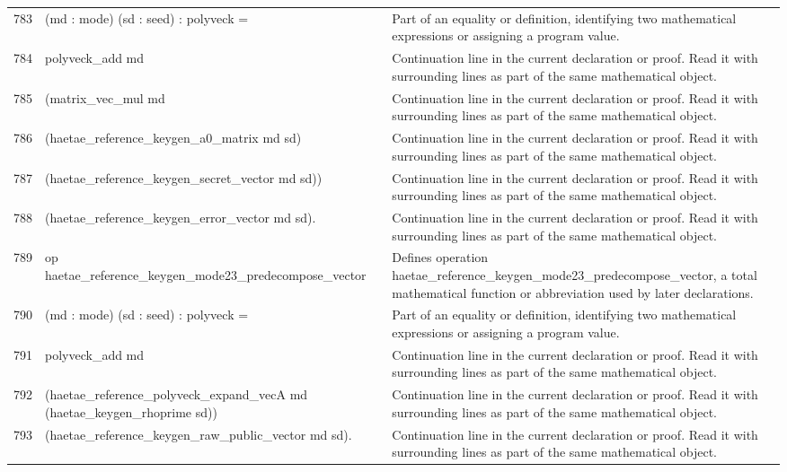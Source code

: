 \documentclass[10pt]{article}
\begin{document}
\begin{longtable}{r L{0.53\textwidth} L{0.37\textwidth}}
783 & {\ttfamily\scriptsize    (md : mode) (sd : seed) : polyveck =} & Part of an equality or definition, identifying two mathematical expressions or assigning a program value. \\
784 & {\ttfamily\scriptsize   polyveck\_add md} & Continuation line in the current declaration or proof.  Read it with surrounding lines as part of the same mathematical object. \\
785 & {\ttfamily\scriptsize     (matrix\_vec\_mul md} & Continuation line in the current declaration or proof.  Read it with surrounding lines as part of the same mathematical object. \\
786 & {\ttfamily\scriptsize       (haetae\_reference\_keygen\_a0\_matrix md sd)} & Continuation line in the current declaration or proof.  Read it with surrounding lines as part of the same mathematical object. \\
787 & {\ttfamily\scriptsize       (haetae\_reference\_keygen\_secret\_vector md sd))} & Continuation line in the current declaration or proof.  Read it with surrounding lines as part of the same mathematical object. \\
788 & {\ttfamily\scriptsize     (haetae\_reference\_keygen\_error\_vector md sd).} & Continuation line in the current declaration or proof.  Read it with surrounding lines as part of the same mathematical object. \\
789 & {\ttfamily\scriptsize op haetae\_reference\_keygen\_mode23\_predecompose\_vector} & Defines operation haetae\_reference\_keygen\_mode23\_predecompose\_vector, a total mathematical function or abbreviation used by later declarations. \\
790 & {\ttfamily\scriptsize    (md : mode) (sd : seed) : polyveck =} & Part of an equality or definition, identifying two mathematical expressions or assigning a program value. \\
791 & {\ttfamily\scriptsize   polyveck\_add md} & Continuation line in the current declaration or proof.  Read it with surrounding lines as part of the same mathematical object. \\
792 & {\ttfamily\scriptsize     (haetae\_reference\_polyveck\_expand\_vecA md (haetae\_keygen\_rhoprime sd))} & Continuation line in the current declaration or proof.  Read it with surrounding lines as part of the same mathematical object. \\
793 & {\ttfamily\scriptsize     (haetae\_reference\_keygen\_raw\_public\_vector md sd).} & Continuation line in the current declaration or proof.  Read it with surrounding lines as part of the same mathematical object. \\

\end{longtable}
\end{document}
